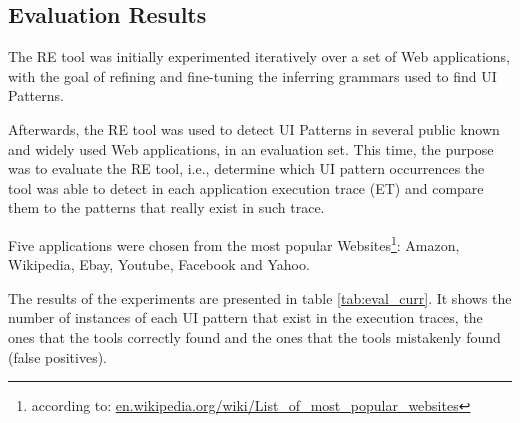 \documentclass[conference]{IEEEtran}
\begin{document}
\subsection{Evaluation Results}

The RE tool was initially experimented iteratively over a set of Web applications, with the goal of refining and fine-tuning the inferring grammars used to find UI Patterns.

Afterwards, the RE tool was used to detect UI Patterns in several public known and widely used Web applications, in an evaluation set. This time, the purpose was to evaluate the RE tool, i.e., determine which UI pattern occurrences the tool was able to detect in each application execution trace (ET) and compare them to the patterns that really exist in such trace.

Five applications were chosen from the most popular Websites\footnote{according to: \url{en.wikipedia.org/wiki/List_of_most_popular_websites‎}}: Amazon, Wikipedia, Ebay, Youtube, Facebook and Yahoo.

The results of the experiments are presented in table \ref{tab:eval_curr}. It shows the number of instances of each UI pattern that exist in the execution traces, the ones that the tools correctly found and the ones that the tools mistakenly found (false positives). 

\begin{table}[!htb]
\caption{Evaluation set results from the current tool.}
\label{tab:eval_curr}
\end{table}
\end{document}
